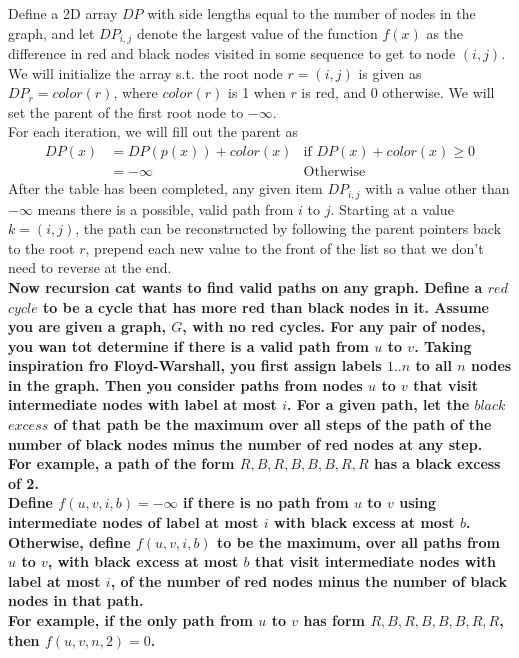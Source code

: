 \documentclass{article}
\begin{document}
\begin{enumerate}
\begin{enumerate}
Define a 2D array $DP$ with side lengths equal to the number of nodes in the graph, and let $DP_{i,j}$ denote the largest value of the function $f(x)$ as the difference in red and black nodes visited in some sequence to get to node $(i,j)$. \\
\newline 
We will initialize the array s.t. the root node $r=(i,j)$ is given as $DP_r = color(r)$, where $color(r)$ is 1 when $r$ is red, and 0 otherwise. We will set the parent of the first root node to $- \infty$. \\
\newline 
For each iteration, we will fill out the parent as 
\begin{align*}
    DP(x) & = DP(p(x)) + color(x) & \text{if }DP(x) + color(x) \geq 0 \\
    & = -\infty & \text{Otherwise}
\end{align*}
After the table has been completed, any given item $DP_{i,j}$ with a value other than $- \infty$ means there is a possible, valid path from $i$ to $j$. Starting at a value $k = (i,j)$, the path can be reconstructed by following the parent pointers back to the root $r$, prepend each new value to the front of the list so that we don't need to reverse at the end. \\









\textbf{Now recursion cat wants to find valid paths on any graph. Define a $red$ $cycle$ to be a cycle that has more red than black nodes in it. Assume you are given a graph, $G$, with no red cycles. For any pair of nodes, you wan tot determine if there is a valid path from $u$ to $v$. Taking inspiration fro Floyd-Warshall, you first assign labels $1..n$ to all $n$ nodes in the graph. Then you consider paths from nodes $u$ to $v$ that visit intermediate nodes with label at most $i$. For a given path, let the $black$ $excess$ of that path be the maximum over all steps of the path of the number of black nodes minus the number of red nodes at any step. } \\
\textbf{ For example, a path of the form $R,B,R,B,B,B,R,R$ has a black excess of 2. } \\
\textbf{Define $f(u,v,i,b) = - \infty$ if there is no path from $u$ to $v$ using intermediate nodes of label at most $i$ with black excess at most $b$. Otherwise, define $f(u,v,i,b)$ to be the maximum, over all paths from $u$ to $v$, with black excess at most $b$ that visit intermediate nodes with label at most $i$, of the number of red nodes minus the number of black nodes in that path. } \\
\textbf{ For example, if the only path from $u$ to $v$ has form $R,B,R,B,B,B,R,R$, then $f(u,v,n,2)=0$. } \\


\end{enumerate}
\end{enumerate}
\end{document}
